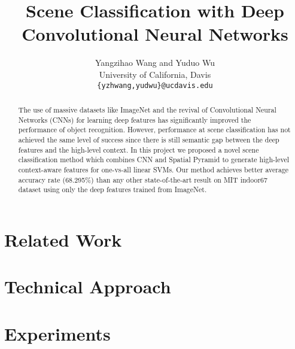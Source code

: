 \documentclass[10pt,twocolumn,letterpaper]{article}
\begin{document}
\title{Scene Classification with Deep Convolutional Neural Networks}

\author{Yangzihao Wang and Yuduo Wu\\
University of California, Davis\\
{\tt\small \{yzhwang,yudwu\}@ucdavis.edu}
}

\maketitle

\begin{abstract}
The use of massive datasets like ImageNet and the revival of Convolutional
Neural Networks (CNNs) for learning deep features has significantly improved
the performance of object recognition. However, performance at scene
classification has not achieved the same level of success since there is still
semantic gap between the deep features and the high-level context.  In this
project we proposed a novel scene classification method which combines CNN and
Spatial Pyramid to generate high-level context-aware features for one-vs-all
linear SVMs. Our method achieves better average accuracy rate (68.295\%) than
any other state-of-the-art result on MIT indoor67 dataset using only the deep
features trained from ImageNet.

\end{abstract}

\section{Related Work}
\label{sec:related}


\section{Technical Approach}
\label{sec:method}


\section{Experiments}
\label{sec:results}

\end{document}
